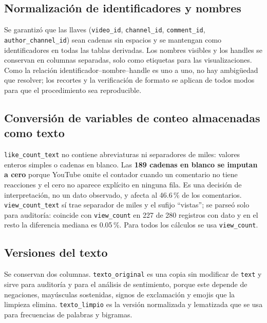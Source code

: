 \documentclass[11pt,a4paper]{article}
\begin{document}
\subsection{Normalizaci\'on de identificadores y nombres}
Se garantiz\'o que las llaves (\texttt{video\_id}, \texttt{channel\_id}, \texttt{comment\_id},
\texttt{author\_channel\_id}) sean cadenas sin espacios y se mantengan como identificadores en todas
las tablas derivadas. Los nombres visibles y los handles se conservan en columnas separadas, solo como
etiquetas para las visualizaciones. Como la relaci\'on identificador--nombre--handle es uno a uno, no
hay ambig\"uedad que resolver; los recortes y la verificaci\'on de formato se aplican de todos modos
para que el procedimiento sea reproducible.

\subsection{Conversi\'on de variables de conteo almacenadas como texto}
\texttt{like\_count\_text} no contiene abreviaturas ni separadores de miles: valores enteros simples
o cadenas en blanco. Las \textbf{189 cadenas en blanco se imputan a cero} porque YouTube omite el
contador cuando un comentario no tiene reacciones y el cero no aparece expl\'icito en ninguna fila.
Es una decisi\'on de interpretaci\'on, no un dato observado, y afecta al 46.6\,\% de los comentarios.
\texttt{view\_count\_text} s\'i trae separador de miles y el sufijo ``vistas''; se parse\'o solo para
auditor\'ia: coincide con \texttt{view\_count} en 227 de 280 registros con dato y en el resto la
diferencia mediana es 0.05\,\%. Para todos los c\'alculos se usa \texttt{view\_count}.

\subsection{Versiones del texto}
Se conservan dos columnas. \texttt{texto\_original} es una copia sin modificar de \texttt{text} y sirve
para auditor\'ia y para el an\'alisis de sentimiento, porque este depende de negaciones, may\'usculas
sostenidas, signos de exclamaci\'on y emojis que la limpieza elimina. \texttt{texto\_limpio} es la
versi\'on normalizada y lematizada que se usa para frecuencias de palabras y bigramas.
\end{document}
